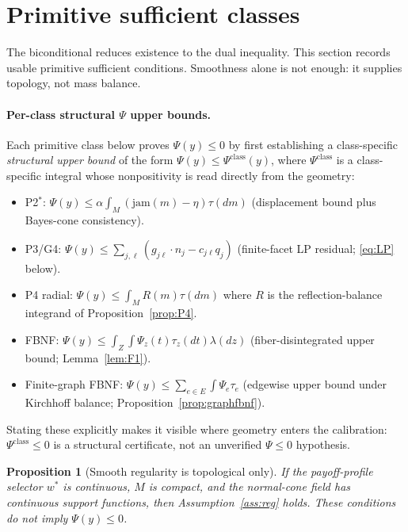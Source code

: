 \documentclass[11pt]{article}
\newtheorem{proposition}[theorem]{Proposition}
\theoremstyle{definition}
\theoremstyle{remark}
\begin{document}
\section{Primitive sufficient classes}\label{sec:primitive}

The biconditional reduces existence to the dual inequality. This section records usable primitive sufficient conditions. Smoothness alone is not enough: it supplies topology, not mass balance.

\paragraph{Per-class structural $\Psi$ upper bounds.} Each primitive class below proves $\Psi(y)\le0$ by first establishing a class-specific \emph{structural upper bound} of the form $\Psi(y)\le \Psi^{\text{class}}(y)$, where $\Psi^{\text{class}}$ is a class-specific integral whose nonpositivity is read directly from the geometry:
\begin{itemize}[leftmargin=*]
  \item P2$^*$: $\Psi(y)\le \alpha\int_M(\mathrm{jam}(m)-\eta)\tau(dm)$ (displacement bound plus Bayes-cone consistency).
  \item P3/G4: $\Psi(y)\le \sum_{j,\ell}(g_{j\ell}\cdot n_j - c_{j\ell}q_j)$ (finite-facet LP residual; \eqref{eq:LP} below).
  \item P4 radial: $\Psi(y)\le \int_M R(m)\tau(dm)$ where $R$ is the reflection-balance integrand of Proposition~\ref{prop:P4}.
  \item FBNF: $\Psi(y)\le \int_Z\!\!\int \Psi_z(t)\tau_z(dt)\lambda(dz)$ (fiber-disintegrated upper bound; Lemma~\ref{lem:F1}).
  \item Finite-graph FBNF: $\Psi(y)\le \sum_{e\in E}\int \Psi_e \tau_e$ (edgewise upper bound under Kirchhoff balance; Proposition~\ref{prop:graphfbnf}).
\end{itemize}
Stating these explicitly makes it visible where geometry enters the calibration: $\Psi^{\text{class}}\le0$ is a structural certificate, not an unverified $\Psi\le0$ hypothesis.

\begin{proposition}[Smooth regularity is topological only]\label{prop:P1}
If the payoff-profile selector $w^*$ is continuous, $M$ is compact, and the normal-cone field has continuous support functions, then Assumption~\ref{ass:reg} holds. These conditions do not imply $\Psi(y)\le0$.
\end{proposition}
\end{document}
